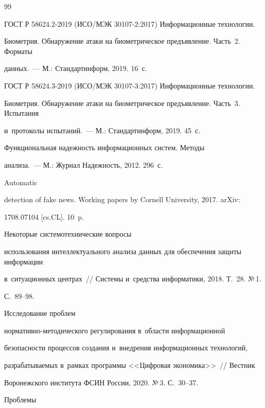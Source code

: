 {{\begin{thebibliography}{99}


ГОСТ Р 58624.2-2019 (ИСО/МЭК 30107-2:2017) Информационные технологии. 


Биометрия. Обнаружение атаки на биометрическое предъявление. Часть~2. Форматы 


данных.~--- М.: Стандартинформ,  2019. 16~с.




ГОСТ Р 58624.3-2019 (ИСО/МЭК 30107-3:2017) Информационные технологии. 


Биометрия. Обнаружение атаки на биометрическое предъявление. Часть~3. Испытания 


и~протоколы испытаний.~--- М.: Стандартинформ, 2019. 45~с.




 Функциональная надежность информационных сис\-тем. Методы 


анализа.~--- М.: Журнал Надежность, 2012. 296~с.




 Automatic 


detection of fake news. Working papers by Cornell University, 2017. arXiv: 


1708.07104 [cs.CL]. 10~p.




 Некоторые системотехнические вопросы 


использования интеллектуального анализа данных для обеспечения защиты информации 


в~ситуационных центрах~/\!\!/ Системы и~средства информатики, 2018. Т.~28. №\,1.  


С.~89--98.




 Исследование проб\-лем  


нор\-ма\-тив\-но-ме\-то\-ди\-че\-ско\-го регулирования в~об\-ласти информационной 


безопасности процессов создания и~внедрения информационных технологий, 


разрабатываемых в~рамках программы <<Цифровая экономика>>~/\!\!/ Вестник 


Воронежского института ФСИН России, 2020. №\,3. С.~30--37.




 Проб\-ле\-мы  



\end{thebibliography}}}
